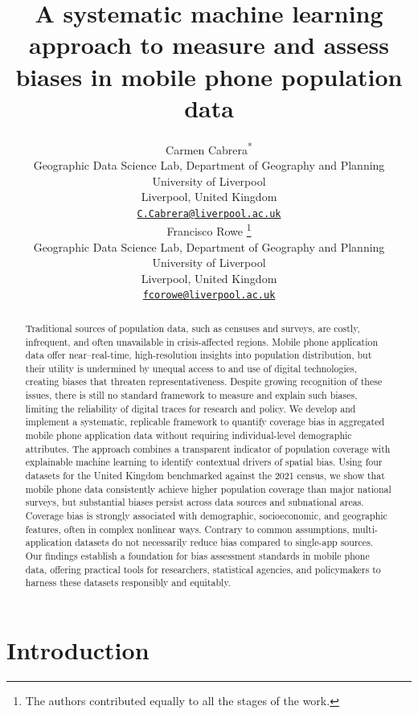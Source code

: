 \documentclass{article}
\title{A systematic machine learning approach to measure and assess biases in mobile phone population data}
\author{
    Carmen Cabrera\textsuperscript{*}
   \\
    Geographic Data Science Lab, Department of Geography and Planning \\
    University of Liverpool \\
  Liverpool, United Kingdom \\
  \texttt{\href{mailto:C.Cabrera@liverpool.ac.uk}{\nolinkurl{C.Cabrera@liverpool.ac.uk}}} \\
   \And
    Francisco Rowe
    \thanks{The authors contributed equally to all the stages of the work.}
   \\
    Geographic Data Science Lab, Department of Geography and Planning \\
    University of Liverpool \\
  Liverpool, United Kingdom \\
  \texttt{\href{mailto:fcorowe@liverpool.ac.uk}{\nolinkurl{fcorowe@liverpool.ac.uk}}} \\
  }
\begin{document}
\maketitle


\begin{abstract}
Traditional sources of population data, such as censuses and surveys, are costly, infrequent, and often unavailable in crisis-affected regions. Mobile phone application data offer near--real-time, high-resolution insights into population distribution, but their utility is undermined by unequal access to and use of digital technologies, creating biases that threaten representativeness. Despite growing recognition of these issues, there is still no standard framework to measure and explain such biases, limiting the reliability of digital traces for research and policy. We develop and implement a systematic, replicable framework to quantify coverage bias in aggregated mobile phone application data without requiring individual-level demographic attributes. The approach combines a transparent indicator of population coverage with explainable machine learning to identify contextual drivers of spatial bias. Using four datasets for the United Kingdom benchmarked against the 2021 census, we show that mobile phone data consistently achieve higher population coverage than major national surveys, but substantial biases persist across data sources and subnational areas. Coverage bias is strongly associated with demographic, socioeconomic, and geographic features, often in complex nonlinear ways. Contrary to common assumptions, multi-application datasets do not necessarily reduce bias compared to single-app sources. Our findings establish a foundation for bias assessment standards in mobile phone data, offering practical tools for researchers, statistical agencies, and policymakers to harness these datasets responsibly and equitably.
\end{abstract}


\section{Introduction}\label{introduction}
\end{document}
